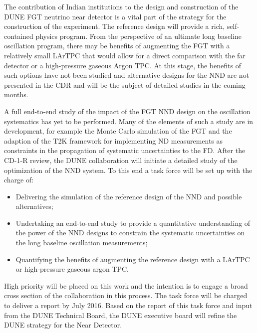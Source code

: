 The contribution of Indian institutions to the design and construction
of the DUNE FGT neutrino near detector is a vital part of the strategy
for the construction of the experiment. The reference design will
provide a rich, self-contained physics program. From the perspective of
an ultimate long baseline oscillation program, there may be benefits
of augmenting the FGT with a relatively small LArTPC that would allow
for a direct comparison with the far detector or a high-pressure
gaseous Argon TPC. At this stage, the benefits of such options have
not been studied and alternative designs for the NND are not presented
in the CDR and will be the subject of detailed studies in the coming
months.

A full end-to-end study of the impact of the FGT NND design on the
oscillation systematics has yet to be performed. Many of the elements
of such a study are in development, for example the Monte Carlo
simulation of the FGT and the adaption of the T2K framework for
implementing ND measurements as constraints in the propagation of
systematic uncertainties to the FD.  After the CD-1-R review, the DUNE
collaboration will initiate a detailed study of the optimization of
the NND system. To this end a task force will be set up with the
charge of:
\begin{itemize}
\item Delivering the simulation of the reference design of the NND and
  possible alternatives;
\item Undertaking an end-to-end study to provide a quantitative
  understanding of the power of the NND designs to constrain the
  systematic uncertainties on the long baseline oscillation measurements;
\item Quantifying the benefits of augmenting the reference design with
  a LArTPC or high-pressure gaseous argon TPC.
\end{itemize}
High priority will be placed on this work and the intention is to
engage a broad cross section of the collaboration in this process. The
task force will be charged to deliver a report by July 2016. Based on
the report of this task force and input from the DUNE Technical Board,
the DUNE executive board will refine the DUNE strategy for the Near
Detector.
